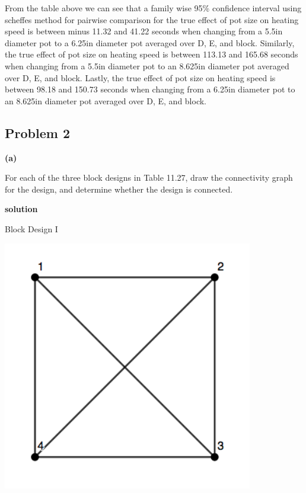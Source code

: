 \documentclass[12pt,]{article}
\begin{document}
From the table above we can see that a family wise 95\% confidence
interval using scheffes method for pairwise comparison for the true
effect of pot size on heating speed is between minus 11.32 and 41.22
seconds when changing from a 5.5in diameter pot to a 6.25in diameter pot
averaged over D, E, and block. Similarly, the true effect of pot size on
heating speed is between 113.13 and 165.68 seconds when changing from a
5.5in diameter pot to an 8.625in diameter pot averaged over D, E, and
block. Lastly, the true effect of pot size on heating speed is between
98.18 and 150.73 seconds when changing from a 6.25in diameter pot to an
8.625in diameter pot averaged over D, E, and block.

\subsection{Problem 2}\label{problem-2}

\textbf{(a)}

For each of the three block designs in Table 11.27, draw the
connectivity graph for the design, and determine whether the design is
connected.

\textbf{solution}

\begin{center}
Block Design I
\end{center}

\begin{center}\includegraphics{Markdown_HW_8_files/figure-latex/unnamed-chunk-7-1} \end{center}
\end{document}
